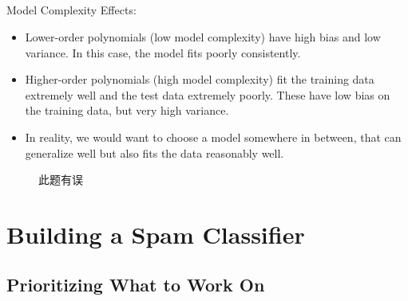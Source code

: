 \documentclass{article}
\begin{document}
\begin{CJK}{UTF8}{gbsn}
\subparagraph{}
Model Complexity Effects:
\begin{itemize}
\item Lower-order polynomials (low model complexity) have high bias and low variance. In this case, the model fits poorly consistently.
\item Higher-order polynomials (high model complexity) fit the training data extremely well and the test data extremely poorly. These have low bias on the training data, but very high variance.
\item In reality, we would want to choose a model somewhere in between, that can generalize well but also fits the data reasonably well.
\end{itemize}
\begin{figure}[H]
\label{fig:650}
\end{figure}
\begin{figure}[H]
\label{fig:651}
\end{figure}
\begin{figure}[H]
\label{fig:652}
\end{figure}
\begin{figure}[H]
\label{fig:653}
\end{figure}
\begin{figure}[H]
\label{fig:654}
\end{figure}
\begin{figure}[H]
\label{fig:655}
\end{figure}
\begin{figure}[H]
\label{fig:656}
\end{figure}
\begin{figure}[H]
\label{fig:657}
\caption{此题有误}
\end{figure}
\section{Building a Spam Classifier}
\subsection{Prioritizing What to Work On}

\end{CJK}
\end{document}
